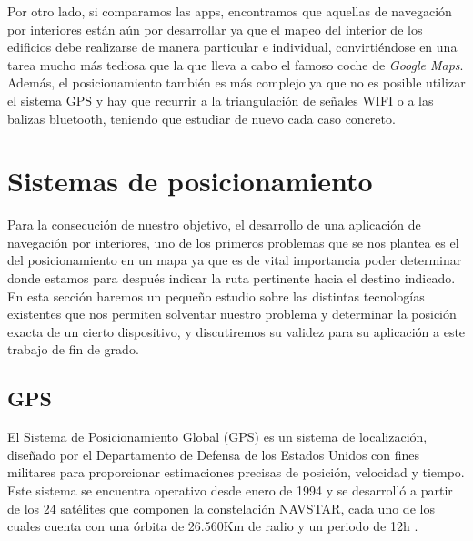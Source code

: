 Por otro lado, si comparamos las apps, encontramos que aquellas de navegación por interiores están aún por desarrollar ya que el mapeo del interior de los edificios debe realizarse de manera particular e individual, convirtiéndose en una tarea mucho más tediosa que la que lleva a cabo el famoso coche de \textit{Google Maps}. Además, el posicionamiento también es más complejo ya que no es posible utilizar el sistema GPS y hay que recurrir a la triangulación de señales WIFI o a las balizas bluetooth, teniendo que estudiar de nuevo cada caso concreto.


\section{Sistemas de posicionamiento}
Para la consecución de nuestro objetivo, el desarrollo de una aplicación de navegación por interiores, uno de los primeros problemas que se nos plantea es el del posicionamiento en un mapa ya que es de vital importancia poder determinar donde estamos para después indicar la ruta pertinente hacia el destino indicado. En esta sección haremos un pequeño estudio sobre las distintas tecnologías existentes que nos permiten solventar nuestro problema y determinar la posición exacta de un cierto dispositivo, y discutiremos su validez para su aplicación a este trabajo de fin de grado.

\subsection{GPS}

El Sistema de Posicionamiento Global (GPS) es un sistema de localización, diseñado por el Departamento de
Defensa de los Estados Unidos con fines militares para proporcionar estimaciones precisas de posición,
velocidad y tiempo. Este sistema se encuentra operativo desde enero de 1994 y se desarrolló a partir de los 24 satélites que componen la constelación NAVSTAR, cada uno de los cuales cuenta con una órbita de 26.560Km de radio y un periodo de 12h \citep{pozo2000sistema}. 

